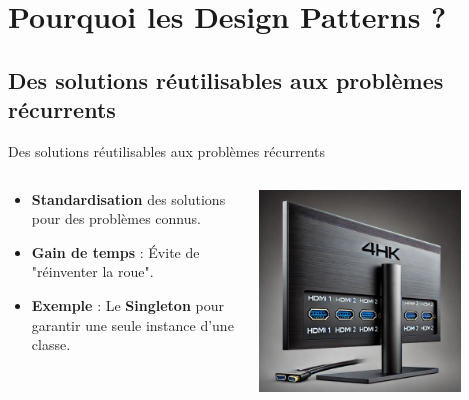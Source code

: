 \documentclass[aspectratio=169]{beamer}
\begin{document}
\section{Pourquoi les Design Patterns ?}

\subsection{Des solutions réutilisables aux problèmes récurrents}

\begin{frame}{Des solutions réutilisables aux problèmes récurrents}
    \begin{columns}
        \begin{column}{0.6\textwidth}
            \begin{itemize}
                \item \textbf{Standardisation} des solutions pour des problèmes connus.
                \item \textbf{Gain de temps} : Évite de "réinventer la roue".
                \pause
                \item \textbf{Exemple} : Le \textbf{Singleton} pour garantir une seule instance d'une classe.
            \end{itemize}
        \end{column}
        \begin{column}{0.4\textwidth}
            \begin{center}
                \includegraphics[width=0.8\textwidth]{pic/singleton_pattern.png}
            \end{center}
        \end{column}
    \end{columns}
\end{frame}
\end{document}
